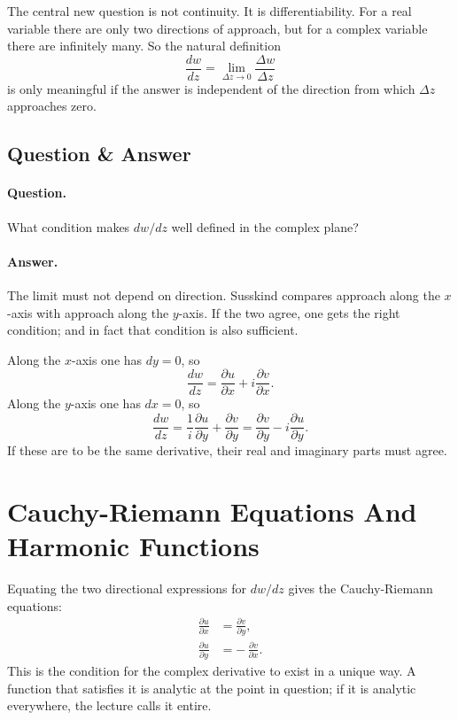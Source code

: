 The central new question is not continuity. It is differentiability. For a real variable there are only two directions of approach, but for a complex variable there are infinitely many. So the natural definition
\begin{equation}
\frac{dw}{dz}=\lim_{\Delta z\to 0}\frac{\Delta w}{\Delta z}
\end{equation}
is only meaningful if the answer is independent of the direction from which \(\Delta z\) approaches zero.

\subsection{Question \& Answer}

\paragraph{Question.} What condition makes \(dw/dz\) well defined in the complex plane?

\paragraph{Answer.} The limit must not depend on direction. Susskind compares approach along the \(x\)-axis with approach along the \(y\)-axis. If the two agree, one gets the right condition; and in fact that condition is also sufficient.

Along the \(x\)-axis one has \(dy=0\), so
\begin{equation}
\frac{dw}{dz}=\frac{\partial u}{\partial x}+i\frac{\partial v}{\partial x}.
\end{equation}
Along the \(y\)-axis one has \(dx=0\), so
\begin{equation}
\frac{dw}{dz}=\frac{1}{i}\frac{\partial u}{\partial y}+\frac{\partial v}{\partial y}
=\frac{\partial v}{\partial y}-i\frac{\partial u}{\partial y}.
\end{equation}
If these are to be the same derivative, their real and imaginary parts must agree.

\section{Cauchy-Riemann Equations And Harmonic Functions}

Equating the two directional expressions for \(dw/dz\) gives the Cauchy-Riemann equations:
\begin{align}
\frac{\partial u}{\partial x} &= \frac{\partial v}{\partial y}, \\
\frac{\partial u}{\partial y} &= -\,\frac{\partial v}{\partial x}.
\end{align}
This is the condition for the complex derivative to exist in a unique way. A function that satisfies it is analytic at the point in question; if it is analytic everywhere, the lecture calls it entire.

